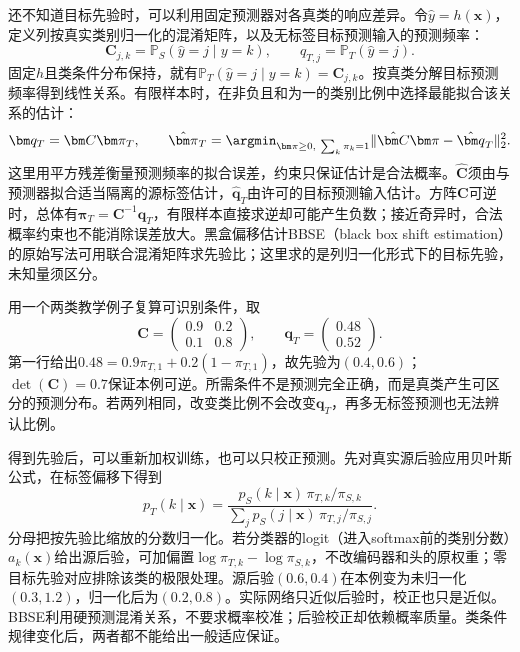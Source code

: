 还不知道目标先验时，可以利用固定预测器对各真类的响应差异。令$\hat y=h(\bm{x})$，定义列按真实类别归一化的混淆矩阵，以及无标签目标预测输入的预测频率：
\[
\bm C_{j,k}=\mathbb P_S(\hat y=j\mid y=k),
\qquad q_{T,j}=\mathbb P_T(\hat y=j).
\]
固定$h$且类条件分布保持，就有$\mathbb P_T(\hat y=j\mid y=k)=\bm C_{j,k}$。按真类分解目标预测频率得到线性关系。有限样本时，在非负且和为一的类别比例中选择最能拟合该关系的估计：
\begin{equation}
\bm q_T=\bm C\bm\pi_T,
\qquad
\hat{\bm\pi}_T
=\argmin_{\bm\pi\ge0,\ \sum_k\pi_k=1}
\lVert\hat{\bm C}\bm\pi-\hat{\bm q}_T\rVert_2^2.
\label{eq:ket-update-bbse}
\end{equation}
这里用平方残差衡量预测频率的拟合误差，约束只保证估计是合法概率。$\hat{\bm C}$须由与预测器拟合适当隔离的源标签估计，$\hat{\bm q}_T$由许可的目标预测输入估计。方阵$\bm C$可逆时，总体有$\bm\pi_T=\bm C^{-1}\bm q_T$，有限样本直接求逆却可能产生负数；接近奇异时，合法概率约束也不能消除误差放大。黑盒偏移估计BBSE（black box shift estimation）的原始写法可用联合混淆矩阵求先验比；这里求的是列归一化形式下的目标先验，未知量须区分。

用一个两类教学例子复算可识别条件，取
\[
\bm C=
\begin{pmatrix}0.9&0.2\\0.1&0.8\end{pmatrix},
\qquad
\bm q_T=
\begin{pmatrix}0.48\\0.52\end{pmatrix}.
\]
第一行给出$0.48=0.9\pi_{T,1}+0.2(1-\pi_{T,1})$，故先验为$(0.4,0.6)$；$\det(\bm C)=0.7$保证本例可逆。所需条件不是预测完全正确，而是真类产生可区分的预测分布。若两列相同，改变类比例不会改变$\bm q_T$，再多无标签预测也无法辨认比例。

得到先验后，可以重新加权训练，也可以只校正预测。先对真实源后验应用贝叶斯公式，在标签偏移下得到
\begin{equation}
p_T(k\mid\bm{x})
=\frac{p_S(k\mid\bm{x})\,\pi_{T,k}/\pi_{S,k}}
       {\sum_j p_S(j\mid\bm{x})\,\pi_{T,j}/\pi_{S,j}}.
\label{eq:ket-update-prior-correction}
\end{equation}
分母把按先验比缩放的分数归一化。若分类器的logit（进入softmax前的类别分数）$a_k(\bm{x})$给出源后验，可加偏置$\log\pi_{T,k}-\log\pi_{S,k}$，不改编码器和头的原权重；零目标先验对应排除该类的极限处理。源后验$(0.6,0.4)$在本例变为未归一化$(0.3,1.2)$，归一化后为$(0.2,0.8)$。实际网络只近似后验时，校正也只是近似。BBSE利用硬预测混淆关系，不要求概率校准；后验校正却依赖概率质量。类条件规律变化后，两者都不能给出一般适应保证。


